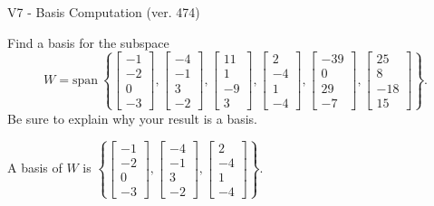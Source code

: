 \begin{exercise}
  \begin{exerciseTitle}V7 - Basis Computation (ver. 474)\end{exerciseTitle}
  \begin{exerciseStatement}
    Find a basis for the subspace 
\[W=\mathrm{span}\ \left\{\left[\begin{array}{r}
-1 \\
-2 \\
0 \\
-3
\end{array}\right] , \left[\begin{array}{r}
-4 \\
-1 \\
3 \\
-2
\end{array}\right] , \left[\begin{array}{r}
11 \\
1 \\
-9 \\
3
\end{array}\right] , \left[\begin{array}{r}
2 \\
-4 \\
1 \\
-4
\end{array}\right] , \left[\begin{array}{r}
-39 \\
0 \\
29 \\
-7
\end{array}\right] , \left[\begin{array}{r}
25 \\
8 \\
-18 \\
15
\end{array}\right]\right\}.\]
 Be sure to explain why your result is a basis.


  \end{exerciseStatement}
  \begin{exerciseAnswer}
   A basis of \(W\) is  \(\left\{\left[\begin{array}{r}
-1 \\
-2 \\
0 \\
-3
\end{array}\right] , \left[\begin{array}{r}
-4 \\
-1 \\
3 \\
-2
\end{array}\right] , \left[\begin{array}{r}
2 \\
-4 \\
1 \\
-4
\end{array}\right]\right\}\).
  


  \end{exerciseAnswer}
\end{exercise}